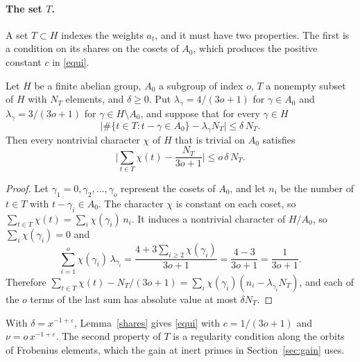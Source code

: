 \paragraph{The set $T$.} A set $T\subset H$ indexes the weights $a_t$, and it must have two properties. The first is a condition on its shares on the cosets of $A_0$, which produces the positive constant $c$ in \eqref{equi}.

\begin{lemma}\label{shares}
Let $H$ be a finite abelian group, $A_0$ a subgroup of index $o$, $T$ a nonempty subset of $H$ with $N_T$ elements, and $\delta\ge0$. Put $\lambda_\gamma=4/(3o+1)$ for $\gamma\in A_0$ and $\lambda_\gamma=3/(3o+1)$ for $\gamma\in H\setminus A_0$, and suppose that for every $\gamma\in H$
\[
\Big\lvert\#\{t\in T:t-\gamma\in A_0\}-\lambda_\gamma N_T\Big\rvert\le\delta\,N_T .
\]
Then every nontrivial character $\chi$ of $H$ that is trivial on $A_0$ satisfies
\[
\Big\lvert\sum_{t\in T}\chi(t)-\frac{N_T}{3o+1}\Big\rvert\le o\,\delta\,N_T .
\]
\end{lemma}

\begin{proof}
Let $\gamma_1=0,\gamma_2,\dots,\gamma_o$ represent the cosets of $A_0$, and let $n_i$ be the number of $t\in T$ with $t-\gamma_i\in A_0$. The character $\chi$ is constant on each coset, so $\sum_{t\in T}\chi(t)=\sum_i\chi(\gamma_i)\,n_i$. It induces a nontrivial character of $H/A_0$, so $\sum_i\chi(\gamma_i)=0$ and
\[
\sum_{i=1}^o\chi(\gamma_i)\,\lambda_{\gamma_i}=\frac{4+3\sum_{i\ge2}\chi(\gamma_i)}{3o+1}=\frac{4-3}{3o+1}=\frac1{3o+1}.
\]
Therefore $\sum_{t\in T}\chi(t)-N_T/(3o+1)=\sum_i\chi(\gamma_i)(n_i-\lambda_{\gamma_i}N_T)$, and each of the $o$ terms of the last sum has absolute value at most $\delta N_T$.
\end{proof}

With $\delta=x^{-1+\varepsilon}$, Lemma~\ref{shares} gives \eqref{equi} with $c=1/(3o+1)$ and $\nu=o\,x^{-1+\varepsilon}$. The second property of $T$ is a regularity condition along the orbits of Frobenius elements, which the gain at inert primes in Section~\ref{sec:gain} uses.

